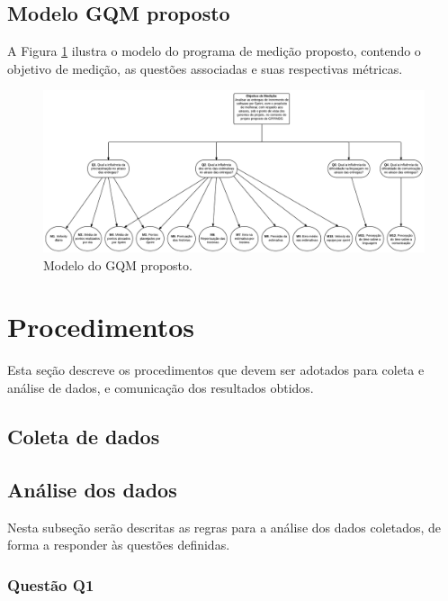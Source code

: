       \vfill
      \pagebreak
      \subsection{Modelo GQM proposto}
      
	A Figura \ref{gqm_proposto} ilustra o modelo do programa de medição proposto, contendo o objetivo de medição, as 
	questões associadas e suas respectivas métricas.
	
	\begin{figure}[!htb]
	  \centering
	  \includegraphics[scale=0.27, angle=90]{figuras/GQM}
	  \caption[Modelo do GQM proposto.]{Modelo do GQM proposto.}
	  \label{gqm_proposto}
	\end{figure}
      
    \section{Procedimentos}
     
      Esta seção descreve os procedimentos que devem ser adotados para coleta e análise de dados, e comunicação dos resultados obtidos.
      
      \subsection{Coleta de dados}
      
      \subsection{Análise dos dados}

      	Nesta subseção serão descritas as regras para a análise dos dados coletados, de forma a responder às questões definidas.

      	\subsubsection{Questão Q1}

